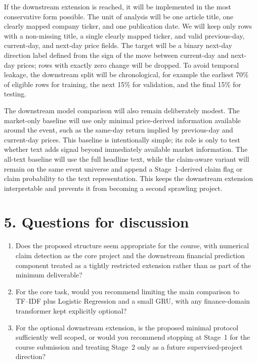 \documentclass[11pt]{article}
\begin{document}
If the downstream extension is reached, it will be implemented in the most conservative form possible. The unit of analysis will be one article title, one clearly mapped company ticker, and one publication date. We will keep only rows with a non-missing title, a single clearly mapped ticker, and valid previous-day, current-day, and next-day price fields. The target will be a binary next-day direction label defined from the sign of the move between current-day and next-day prices; rows with exactly zero change will be dropped. To avoid temporal leakage, the downstream split will be chronological, for example the earliest 70\% of eligible rows for training, the next 15\% for validation, and the final 15\% for testing.

The downstream model comparison will also remain deliberately modest. The market-only baseline will use only minimal price-derived information available around the event, such as the same-day return implied by previous-day and current-day prices. This baseline is intentionally simple; its role is only to test whether text adds signal beyond immediately available market information. The all-text baseline will use the full headline text, while the claim-aware variant will remain on the same event universe and append a Stage~1-derived claim flag or claim probability to the text representation. This keeps the downstream extension interpretable and prevents it from becoming a second sprawling project.

\section*{5. Questions for discussion}
\begin{enumerate}[leftmargin=1.5em]
\item Does the proposed structure seem appropriate for the course, with numerical claim detection as the core project and the downstream financial prediction component treated as a tightly restricted extension rather than as part of the minimum deliverable?
\item For the core task, would you recommend limiting the main comparison to TF--IDF plus Logistic Regression and a small GRU, with any finance-domain transformer kept explicitly optional?
\item For the optional downstream extension, is the proposed minimal protocol sufficiently well scoped, or would you recommend stopping at Stage~1 for the course submission and treating Stage~2 only as a future supervised-project direction?
\end{enumerate}
\end{document}
